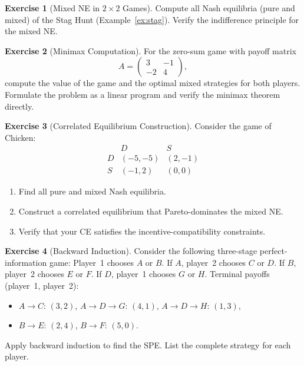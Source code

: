 \documentclass[11pt,a4paper]{article}
\theoremstyle{definition}
\newtheorem{exercise}{Exercise}[section]
\theoremstyle{plain}
\theoremstyle{remark}
\begin{document}
\begin{exercise}[Mixed NE in $2 \times 2$ Games]
\label{ex:mixed_2x2}
Compute all Nash equilibria (pure and mixed) of the Stag Hunt
(Example~\ref{ex:stag}). Verify the indifference principle for the mixed NE.
\end{exercise}

\begin{exercise}[Minimax Computation]
\label{ex:minimax}
For the zero-sum game with payoff matrix
\[
A = \begin{pmatrix} 3 & -1 \\ -2 & 4 \end{pmatrix},
\]
compute the value of the game and the optimal mixed strategies for both players.
Formulate the problem as a linear program and verify the minimax theorem directly.
\end{exercise}

\begin{exercise}[Correlated Equilibrium Construction]
\label{ex:ce_construct}
Consider the game of Chicken:
\[
\begin{array}{c|cc}
 & D & S \\ \hline
D & (-5,-5) & (2,-1) \\
S & (-1,2) & (0,0)
\end{array}
\]
\begin{enumerate}[nosep,label=(\alph*)]
    \item Find all pure and mixed Nash equilibria.
    \item Construct a correlated equilibrium that Pareto-dominates the mixed NE.
    \item Verify that your CE satisfies the incentive-compatibility constraints.
\end{enumerate}
\end{exercise}

\begin{exercise}[Backward Induction]
\label{ex:backward}
Consider the following three-stage perfect-information game: Player~1 chooses $A$ or $B$.
If $A$, player~2 chooses $C$ or $D$. If $B$, player~2 chooses $E$ or $F$.
If $D$, player~1 chooses $G$ or $H$. Terminal payoffs (player~1, player~2):
\begin{itemize}[nosep]
    \item $A \to C$: $(3,2)$, \quad $A \to D \to G$: $(4,1)$, \quad $A \to D \to H$: $(1,3)$,
    \item $B \to E$: $(2,4)$, \quad $B \to F$: $(5,0)$.
\end{itemize}
Apply backward induction to find the SPE. List the complete strategy for each player.
\end{exercise}
\end{document}
